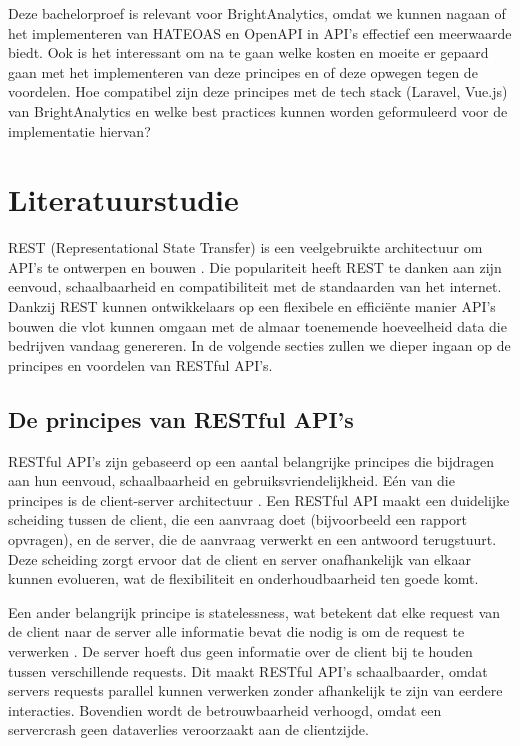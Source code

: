 \bigskip

Deze bachelorproef is relevant voor BrightAnalytics, omdat we kunnen nagaan of het implementeren van HATEOAS en OpenAPI in API's effectief een meerwaarde biedt. Ook is het interessant om na te gaan welke kosten en moeite er gepaard gaan met het implementeren van deze principes en of deze opwegen tegen de voordelen. Hoe compatibel zijn deze principes met de tech stack (Laravel, Vue.js) van BrightAnalytics en welke best practices kunnen worden geformuleerd voor de implementatie hiervan?

\section{Literatuurstudie}%
\label{sec:literatuurstudie}

REST (Representational State Transfer) is een veelgebruikte architectuur om API's te ontwerpen en bouwen \autocite{Eddouibi2017}. Die populariteit heeft REST te danken aan zijn eenvoud, schaalbaarheid en compatibiliteit met de standaarden van het internet. Dankzij REST kunnen ontwikkelaars op een flexibele en efficiënte manier API's bouwen die vlot kunnen omgaan met de almaar toenemende hoeveelheid data die bedrijven vandaag genereren. In de volgende secties zullen we dieper ingaan op de principes en voordelen van RESTful API's.

\subsection{De principes van RESTful API's}

RESTful API's zijn gebaseerd op een aantal belangrijke principes die bijdragen aan hun eenvoud, schaalbaarheid en gebruiksvriendelijkheid. Eén van die principes is de client-server architectuur \autocite{Fielding2000}. Een RESTful API maakt een duidelijke scheiding tussen de client, die een aanvraag doet (bijvoorbeeld een rapport opvragen), en de server, die de aanvraag verwerkt en een antwoord terugstuurt. Deze scheiding zorgt ervoor dat de client en server onafhankelijk van elkaar kunnen evolueren, wat de flexibiliteit en onderhoudbaarheid ten goede komt.

\bigskip

Een ander belangrijk principe is statelessness, wat betekent dat elke request van de client naar de server alle informatie bevat die nodig is om de request te verwerken \autocite{Fielding2000}. De server hoeft dus geen informatie over de client bij te houden tussen verschillende requests. Dit maakt RESTful API's schaalbaarder, omdat servers requests parallel kunnen verwerken zonder afhankelijk te zijn van eerdere interacties. Bovendien wordt de betrouwbaarheid verhoogd, omdat een servercrash geen dataverlies veroorzaakt aan de clientzijde.

